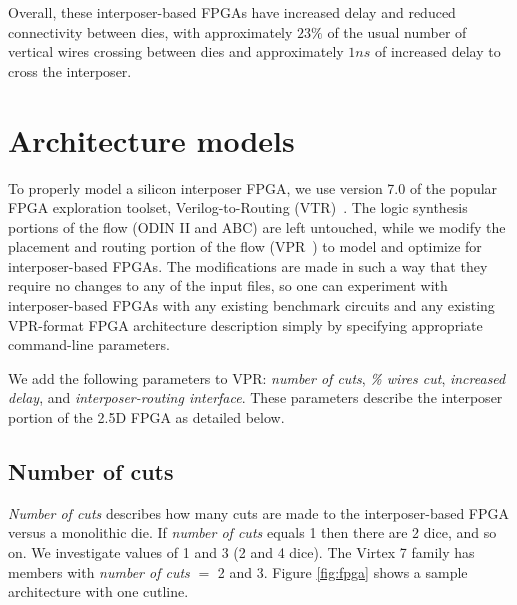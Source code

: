 \documentclass{sig-alternate-2013}
\begin{document}
Overall, these interposer-based FPGAs have increased delay and reduced connectivity between dies, with approximately $23\%$ of the usual number of vertical wires crossing between dies and approximately $1ns$ of increased delay to cross the interposer.

\section{Architecture models}
\label{archSection}
To properly model a silicon interposer FPGA, we use version 7.0 of the popular FPGA exploration toolset, Verilog-to-Routing (VTR)~\cite{luu2014vtr}. The logic synthesis portions of the flow (ODIN II and  ABC) are left untouched, while we modify the placement and routing portion of the flow (VPR~\cite{betz1997vpr}) to model and optimize for interposer-based FPGAs. The modifications are made in such a way that they require no changes to any of the input files, so one can experiment with interposer-based FPGAs with any existing benchmark circuits and any existing VPR-format FPGA architecture description simply by specifying appropriate command-line parameters.

We add the following parameters to VPR: \textit{number of cuts}, \textit{\% wires cut}, \textit{increased delay}, and \textit{interposer-routing interface}. These parameters describe the interposer portion of the 2.5D FPGA as detailed below.

\subsection{Number of cuts}
\textit{Number of cuts} describes how many cuts are made to the interposer-based FPGA versus a monolithic die. If \textit{number of cuts} equals 1 then there are 2 dice, and so on. We investigate values of 1 and 3 (2 and 4 dice). The Virtex 7 family has members with \textit{number of cuts} $=$ 2 and 3. Figure \ref{fig:fpga} shows a sample architecture with one cutline.
\end{document}
